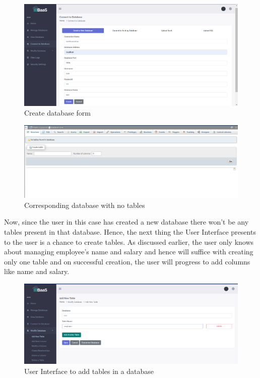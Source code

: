 \documentclass[letterpaper, 10 pt, conference]{ieeeconf}
\begin{document}
\begin{figure}[h]
   \centering
   \includegraphics[scale=0.17]{./fig1.png}
   \caption{Create database form}
   \label{fig:my_label}
\end{figure}

\begin{figure}[h]
   \centering
   \includegraphics[scale=0.19]{./fig2.png}
   \caption{Corresponding database with no tables}
   \label{fig:my_label}
\end{figure}



Now, since the user in this case has created a new database there won’t be any tables present in that database. Hence, the next thing the User Interface presents to the user is a chance to create tables. As discussed earlier, the user only knows about managing employee’s name and salary and hence will suffice with creating only one table and on successful creation, the user will progress to add columns like name and salary.

\begin{figure}[h]
   \centering
   \includegraphics[scale=0.17]{./fig3.png}
   \caption{User Interface to add tables in a database}
   \label{fig:my_label}
\end{figure}
\end{document}
